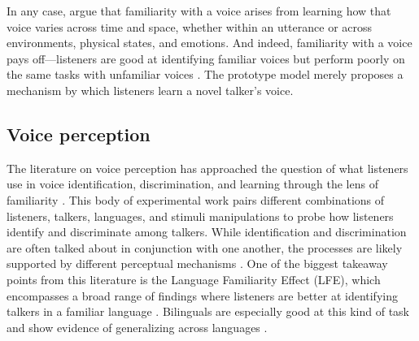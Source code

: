 In any case, \citet{lee_2019_acoustic} argue that familiarity with a voice arises from learning how that voice varies across time and space, whether within an utterance or across environments, physical states, and emotions. And indeed, familiarity with a voice pays off---listeners are good at identifying familiar voices but perform poorly on the same tasks with unfamiliar voices \citep{nygaard_1998_talker}. The prototype model merely proposes a mechanism by which listeners learn a novel talker's voice. 

\subsection{Voice perception}

The literature on voice perception has approached the question of what listeners use in voice identification, discrimination, and learning through the lens of familiarity \citep{levi_2019_methodological, perrachione_2018_recognizing}. This body of experimental work pairs different combinations of listeners, talkers, languages, and stimuli manipulations to probe how listeners identify and discriminate among talkers. While identification and discrimination are often talked about in conjunction with one another, the processes are likely supported by different perceptual mechanisms \citep{perrachione_2019_judgments}. One of the biggest takeaway points from this literature is the Language Familiarity Effect (LFE), which encompasses a broad range of findings where listeners are better at identifying talkers in a familiar language \citep[for a recent review, see][]{perrachione_2018_recognizing}. Bilinguals are especially good at this kind of task and show evidence of generalizing across languages \citep{orena_2019_identifying}. 

